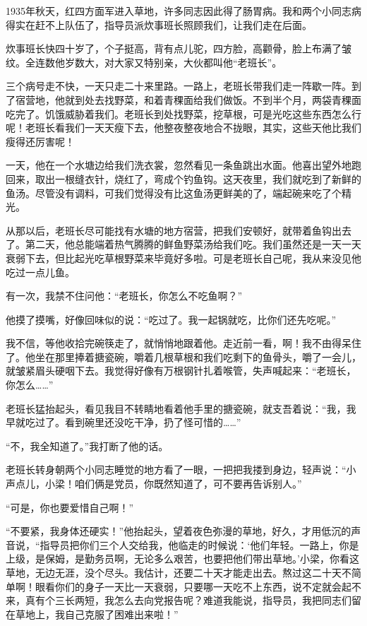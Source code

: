 \documentclass[12pt,UTF-8,openany]{ctexbook}
\begin{document}
\begin{large}
    
    1935年秋天，红四方面军进入草地，许多同志因此得了肠胃病。我和两个小同志病得实在赶不上队伍了，指导员派炊事班长照顾我们，让我们走在后面。
    
    炊事班长快四十岁了，个子挺高，背有点儿驼，四方脸，高颧骨，脸上布满了皱纹。全连数他岁数大，对大家又特别亲，大伙都叫他“老班长”。
    
    三个病号走不快，一天只走二十来里路。一路上，老班长带我们走一阵歇一阵。到了宿营地，他就到处去找野菜，和着青稞面给我们做饭。不到半个月，两袋青稞面吃完了。饥饿威胁着我们。老班长到处找野菜，挖草根，可是光吃这些东西怎么行呢！老班长看我们一天天瘦下去，他整夜整夜地合不拢眼，其实，这些天他比我们瘦得还厉害呢！
    
    一天，他在一个水塘边给我们洗衣裳，忽然看见一条鱼跳出水面。他喜出望外地跑回来，取出一根缝衣针，烧红了，弯成个钓鱼钩。这天夜里，我们就吃到了新鲜的鱼汤。尽管没有调料，可我们觉得没有比这鱼汤更鲜美的了，端起碗来吃了个精光。
    
    从那以后，老班长尽可能找有水塘的地方宿营，把我们安顿好，就带着鱼钩出去了。第二天，他总能端着热气腾腾的鲜鱼野菜汤给我们吃。我们虽然还是一天一天衰弱下去，但比起光吃草根野菜来毕竟好多啦。可是老班长自己呢，我从来没见他吃过一点儿鱼。
    
    有一次，我禁不住问他：“老班长，你怎么不吃鱼啊？”
    
    他摸了摸嘴，好像回味似的说：“吃过了。我一起锅就吃，比你们还先吃呢。”
    
    我不信，等他收拾完碗筷走了，就悄悄地跟着他。走近前一看，啊！我不由得呆住了。他坐在那里捧着搪瓷碗，嚼着几根草根和我们吃剩下的鱼骨头，嚼了一会儿，就皱紧眉头硬咽下去。我觉得好像有万根钢针扎着喉管，失声喊起来：“老班长，你怎么……”
    
    老班长猛抬起头，看见我目不转睛地看着他手里的搪瓷碗，就支吾着说：“我，我早就吃过了。看到碗里还没吃干净，扔了怪可惜的……”
    
    “不，我全知道了。”我打断了他的话。
    
    老班长转身朝两个小同志睡觉的地方看了一眼，一把把我搂到身边，轻声说：“小声点儿，小梁！咱们俩是党员，你既然知道了，可不要再告诉别人。”
    
    “可是，你也要爱惜自己啊！”
    
    “不要紧，我身体还硬实！”他抬起头，望着夜色弥漫的草地，好久，才用低沉的声音说，“指导员把你们三个人交给我，他临走的时候说：‘他们年轻。一路上，你是上级，是保姆，是勤务员啊，无论多么艰苦，也要把他们带出草地。’小梁，你看这草地，无边无涯，没个尽头。我估计，还要二十天才能走出去。熬过这二十天不简单啊！眼看你们的身子一天比一天衰弱，只要哪一天吃不上东西，说不定就会起不来，真有个三长两短，我怎么去向党报告呢？难道我能说，指导员，我把同志们留在草地上，我自己克服了困难出来啦！”
    

\end{large}
\end{document}
